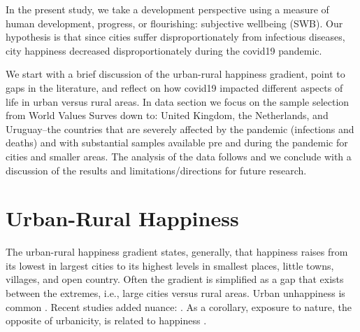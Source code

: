 \documentclass[10pt, letterpaper]{article}
\begin{document}
\begin{spacing}{1.4}

In the present study, we take a development perspective using a measure of human
development, progress, or flourishing: subjective wellbeing (SWB). Our 
 hypothesis is that since cities suffer disproportionately from
infectious diseases, city happiness decreased disproportionately during the
covid19 pandemic.

We start with a brief discussion of the urban-rural happiness gradient, point to
gaps in the literature, and reflect on how covid19 impacted different aspects of
life in urban versus rural areas.  In data section  we focus on the sample
selection from World Values Surves down to: United Kingdom, the Netherlands, and
Uruguay--the countries that are severely affected by the pandemic (infections
and deaths) and with substantial samples available pre and during the pandemic for
cities and smaller areas.  The analysis of the data follows and we conclude with a discussion of the results and limitations/directions for future research. %



\section{Urban-Rural Happiness}

The urban-rural happiness gradient states, generally, that happiness raises from its
lowest in largest cities to its highest levels in smallest places, little towns, villages, and open country. Often the gradient is simplified as a gap that exists between the extremes, i.e.,
large cities versus rural areas. 
%
 Urban unhappiness is
 common \citep{aok21,senior_ny_sep16_14,lenzi16D,morrison15,morrison17,anonDNK20,sorensen14}. {Recent studies added nuance: \citet{lenzi20,morrison21,aok-swbGenYcity18,anon-regStu-oslo-swb,anon-regional-studies-19,lenzi22}.}
 As a corollary, exposure to nature, the opposite of urbanicity, is related to happiness
 \citep{pretty12, frumkin01,  tesson13, maller06,
   berman12}. %



\end{spacing}
\end{document}
